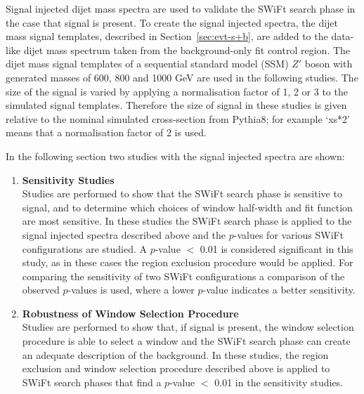 Signal injected dijet mass spectra are used to validate the SWiFt search phase in the case that signal is present.
To create the signal injected spectra, the dijet mass signal templates, described in Section~\ref{sec:evt-s+b},
are added to the data-like dijet mass spectrum taken from the background-only fit control region.
The dijet mass signal templates of a sequential standard model (SSM) $Z'$ boson with generated masses of 600, 800 and 1000 GeV are used in the following studies.
The size of the signal is varied by applying a normalisation factor of 1, 2 or 3 to the simulated signal templates.
Therefore the size of signal in these studies is given relative to the nominal simulated cross-section from {\sc Pythia8};
for example `xs*2' means that a normalisation factor of 2 is used.

\noindent
In the following section two studies with the signal injected spectra are shown:
\begin{enumerate}
  \item\textbf{Sensitivity Studies}\\
  Studies are performed to show that the SWiFt search phase is sensitive to signal,
  and to determine which choices of window half-width and fit function are most sensitive.
  In these studies the SWiFt search phase is applied to the signal injected spectra described above and
  the \bh{} \mbox{$p$-value}s for various SWiFt configurations are studied.
  A \mbox{$p$-value} $<$ 0.01 is considered significant in this study,
  as in these cases the region exclusion procedure would be applied.
  For comparing the sensitivity of two SWiFt configurations a comparison of the
  observed \bh{} \mbox{$p$-value}s is used, where a lower \mbox{$p$-value} indicates a better sensitivity.\vspace{1em}
  
  \item\textbf{Robustness of Window Selection Procedure}\\
    Studies are performed to show that, if signal is present, the window selection procedure is able to select a window and
    the SWiFt search phase can create an adequate description of the background.
    In these studies, the region exclusion and window selection procedure described above is applied
    to SWiFt search phases that find a \bh{} \mbox{$p$-value} $<$ 0.01 in the sensitivity studies.
\end{enumerate}


